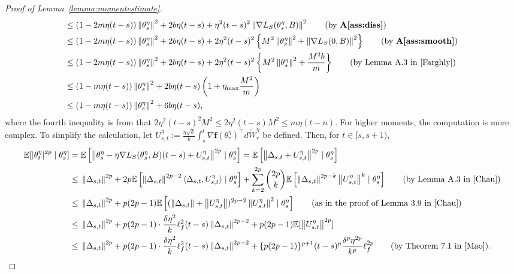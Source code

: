 \documentclass{article}
\newcommand{\norm}[1]{\left\lVert#1\right\rVert} %
\begin{document}
\begin{proof}[Proof of Lemma~\ref{lemma:momentestimate}]
\begin{align}
		 \leq &\;(1-2m\eta(t-s))\norm{\theta_s^\eta}^2 + 2b\eta (t-s)  + \eta^2 (t-s)^2  \norm{\nabla L_S(\theta_s^\eta, B)}^2 \tag{by \textbf{A\ref{ass:diss}}}\\
		\leq &\;(1-2m\eta (t-s))\norm{\theta_s^\eta}^2 +2b\eta (t-s) + 2\eta^2 (t-s)^2 \left\{M^2 \norm{\theta_s^\eta}^2 + \norm{\nabla L_S(0, B)}^2 \right\} \tag{by \textbf{A\ref{ass:smooth}}}\\
		\leq &\;(1-2m\eta (t-s))\norm{\theta_s^\eta}^2 + 2b\eta (t-s) + 2\eta^2 (t-s)^2 \left\{ M^2 \norm{\theta_s^\eta}^2 + \frac{ M^2 b}{m} \right\} \tag{by Lemma A.3 in \cite{Farghly}}\\
		\leq &\;(1-m\eta (t-s))\norm{\theta_s^\eta}^2 + 2b \eta (t-s) \left(1+ \eta_{\max}  \frac{ M^2 }{m} \right) \label{delta}\\
		\leq&\;(1-m\eta (t-s))\norm{\theta_s^\eta}^2 + 6b \eta (t-s) \notag,
	\end{align}
	where the fourth inequality is from that $2 \eta^2 (t-s)^2 M^2 \leq 2 \eta^2 (t-s)M^2 \leq m \eta(t-n)$.
	For higher moments, the computation is more complex. To simplify the calculation, let $U_{s,t}^\eta := \frac{\eta\sqrt{\delta}}{k} \int_s^t \nabla \mathbf{f} (\theta_r^\eta)^\top d\tilde{W}_r^\eta$ be defined. Then, for $t \in  [s, s+1)$,
	\begingroup
	\allowdisplaybreaks
	\begin{align*}
		\mathbb{E}[|\theta_t^\eta|^{2p} \mid \theta_s^\eta]  =&\; \mathbb{E}\left[\norm{\theta_s^\eta - \eta \nabla L_S(\theta_s^\eta, B)(t-s) + U_{s,t}^\eta}^{2p} \mid  \theta_s^\eta \right]
		= \mathbb{E}\left[\norm{\Delta_{s,t} + U_{s,t}^\eta}^{2p} \mid  \theta_s^\eta \right]\\
		\leq&\; \norm{\Delta_{s,t}}^{2p} + 2p \mathbb{E}\left[  \norm{\Delta_{s,t}}^{2p-2} \langle \Delta_{s,t},U_{s,t}^\eta \rangle \mid  \theta_s^\eta \right] + \sum_{k=2}^{2p} {2p \choose k} \mathbb{E}\left[ \norm{\Delta_{s,t}}^{2p-k} \norm{U_{s,t}^\eta }^k \mid  \theta_s^\eta \right] \tag{by Lemma A.3 in \cite{Chau}}\\
		\leq&\; \norm{\Delta_{s,t}}^{2p} + p(2p-1) \mathbb{E} \left[(\norm{\Delta_{s,t}} +\norm{U_{s,t}^\eta})^{2p-2} \norm{U_{s.t}^\eta}^2 \mid \theta_s^\eta \right] \tag{as in the proof of Lemma 3.9 in \cite{Chau}}\\
		\leq&\; \norm {\Delta_{s,t}} ^{2p} + p (2p - 1) \cdot \frac{\delta \eta^2}{k} \ell_f^2 (t-s) \norm {\Delta_{s,t}} ^{2p-2} + p(2p-1) \mathbb{E} [\norm{ U_{s,t}^\eta} ^{2p}]\\
		\leq&\; \norm{\Delta_{s,t}}^{2p} + p (2p - 1) \cdot \frac{\delta \eta^2}{k} \ell_f^2 (t-s) \norm{ \Delta_{s,t}}^{2p-2}+ \{p(2p-1)\}^{p+1} (t-s)^p \frac{\delta^p \eta^{2p}}{k^{p}} \ell_f^{2p} \tag{by Theorem 7.1 in \cite{Mao}}.

\end{align*}
\end{proof}
\end{document}
